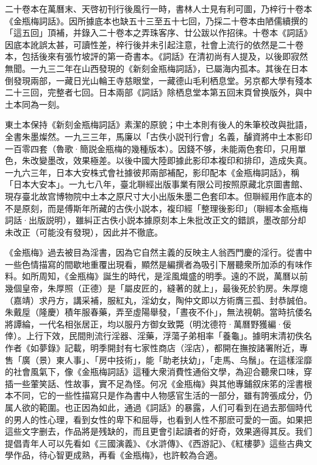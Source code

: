 二十卷本在萬曆末、天啓初刊行後風行一時，書林人士見有利可圖，乃梓行十卷本《金瓶梅詞話》。因所據底本也缺五十三至五十七回，乃採二十卷本由陋儒續撰的「這五回」頂補，并錄入二十卷本之弄珠客序、廿公跋以作招徕。十卷本《詞話》因底本訛誤太甚，可讀性差，梓行後并未引起注意，社會上流行的依然是二十卷本，包括後來有張竹坡評的第一奇書本。《詞話》在清初尚有人提及，以後即寂然無聞。一九三二年在山西發現的《新刻金瓶梅詞話》，已屬海内孤本。其後在日本倒發現兩部，一藏日光山輪王寺慈眼堂，一藏德山毛利栖息堂。另京都大學有殘本二十三回，完整者七回。日本兩部《詞話》除栖息堂本第五回末頁曾换版外，與中土本同為一刻。

東土本保持《新刻金瓶梅詞話》素潔的原貌；中土本則有後人的朱筆校改與批語，全書朱墨燦然。一九三三年，馬廉以「古佚小説刊行會」名義，醵資將中土本影印一百零四套{\innerzhushi（魯歌·簡説金瓶梅的幾種版本）}。因錢不够，未能兩色套印，只用單色，朱改變墨改，效果極差。以後中國大陸即據此影印本複印和排印，造成失真。一九六三年，日本大安株式會社據彼邦兩部補配，影印配本《金瓶梅詞話》，稱「日本大安本」。一九七八年，臺北聨經出版事業有限公司按照原藏北京圖書館、現存臺北故宫博物院中土本之原尺寸大小出版朱墨二色套印本。但聨經用作底本的不是原刻，而是傅斯年所藏的古佚小説本，複印經「整理後影印」{\innerzhushi（聨經本金瓶梅詞話·出版説明）}，雖糾正古佚小説本據原刻本上朱批改正文的錯誤，墨改部分却未改正（可能没有發現），因此并不徹底。

《金瓶梅》過去被目為淫書，因為它自然主義的反映主人翁西門慶的淫行。從書中一些色情描寫的間歇地重覆出現看，顯然是編撰者為吸引下層聽衆所加添的有味作料。如所周知，《金瓶梅》誕生的時代，是淫風熾盛的明季。遠的不説，萬曆以前幾個皇帝，朱厚照（正德）是「屬皮匠的，縫著的就上」，最後死於豹房。朱厚熜（嘉靖）求丹方，講采補，服紅丸，淫幼女，陶仲文即以方術膺三孤、封恭誠伯。朱戴垕（隆慶）積年服春藥，弄至虛陽舉發，「晝夜不仆」，無法視朝。當時抗倭名將譚綸，一代名相张居正，均以服丹方御女致斃{\innerzhushi（明沈德符·萬曆野獲編·佞倖）}。上行下效，民間則流行淫器、淫藥，浮蕩子弟相率「養龜」。據明末清初佚名作者《如夢錄》記載，明季開封有七家性商店（淫店），都開在撫按諸署附近，專售「廣（景）東人事」、「房中技術」，能「助老扶幼」，「走馬、乌鬚」。在這樣淫靡的社會風氣下，像《金瓶梅詞話》這種大衆消費性通俗文學，為迎合聽衆口味，穿插一些葷笑話、性故事，實不足為怪。何况《金瓶梅》與其他專鋪叙床笫的淫書根本不同，它的一些性描寫只是作為書中人物感官生活的一部分，雖有誇張成分，仍属人欲的範圍。也正因為如此，通過《詞話》的暴露，人们可看到在過去那個時代的男人的性心理，看到女性的卑下和屈辱，也看到人性不那麽可愛的一面。如果把這些文字删去，作品將是残缺的，而且更會引起讀者的好奇，效果適得其反。我们提倡青年人可以先看如《三國演義》、《水滸傳》、《西游記》、《紅樓夢》這些古典文學作品，待心智更成熟，再看《金瓶梅》，也許較為合適。

